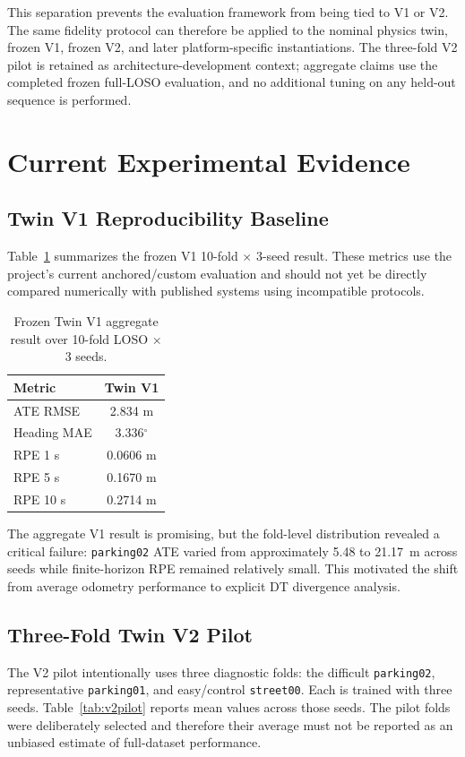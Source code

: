 \documentclass[conference]{IEEEtran}
\begin{document}
This separation prevents the evaluation framework from being tied to V1 or V2. The same fidelity protocol can therefore be applied to the nominal physics twin, frozen V1, frozen V2, and later platform-specific instantiations. The three-fold V2 pilot is retained as architecture-development context; aggregate claims use the completed frozen full-LOSO evaluation, and no additional tuning on any held-out sequence is performed.

\section{Current Experimental Evidence}
\subsection{Twin V1 Reproducibility Baseline}
Table~\ref{tab:v1} summarizes the frozen V1 10-fold $\times$ 3-seed result. These metrics use the project's current anchored/custom evaluation and should not yet be directly compared numerically with published systems using incompatible protocols.

\begin{table}[t]
\centering
\caption{Frozen Twin V1 aggregate result over 10-fold LOSO $\times$ 3 seeds.}
\label{tab:v1}
\begin{tabular}{lc}
\toprule
Metric & Twin V1 \\
\midrule
ATE RMSE & 2.834 m \\
Heading MAE & 3.336$^{\circ}$ \\
RPE 1 s & 0.0606 m \\
RPE 5 s & 0.1670 m \\
RPE 10 s & 0.2714 m \\
\bottomrule
\end{tabular}
\end{table}

The aggregate V1 result is promising, but the fold-level distribution revealed a critical failure: \texttt{parking02} ATE varied from approximately 5.48 to 21.17~m across seeds while finite-horizon RPE remained relatively small. This motivated the shift from average odometry performance to explicit DT divergence analysis.

\subsection{Three-Fold Twin V2 Pilot}
The V2 pilot intentionally uses three diagnostic folds: the difficult \texttt{parking02}, representative \texttt{parking01}, and easy/control \texttt{street00}. Each is trained with three seeds. Table~\ref{tab:v2pilot} reports mean values across those seeds. The pilot folds were deliberately selected and therefore their average must not be reported as an unbiased estimate of full-dataset performance.
\end{document}
